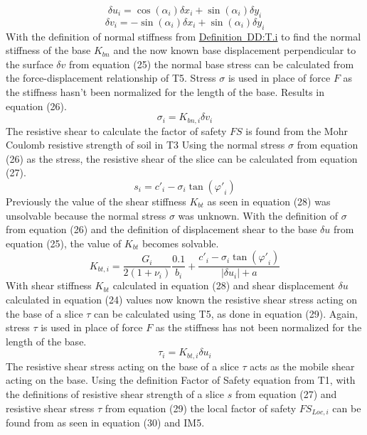 \documentclass[12pt]{article}
\begin{document}
\begin{dmath}
{δu}_{i}=\cos\left(α_{i}\right) {δx}_{i}+\sin\left(α_{i}\right) {δy}_{i}
\end{dmath}
\begin{dmath}
{δv}_{i}=-\sin\left(α_{i}\right) {δx}_{i}+\sin\left(α_{i}\right) {δy}_{i}
\end{dmath}
With the definition of normal stiffness from \hyperref[DD:T.i]{Definition~DD:T.i} to find the normal stiffness of the base ${K_{bn}}$ and the now known base displacement perpendicular to the surface $δv$ from equation (25) the normal base stress can be calculated from the force-displacement relationship of T5. Stress $σ$ is used in place of force $F$ as the stiffness hasn't been normalized for the length of the base. Results in equation (26).
\begin{dmath}
σ_{i}={K_{bn,i}} {δv}_{i}
\end{dmath}
The resistive shear to calculate the factor of safety $FS$ is found from the Mohr Coulomb resistive strength of soil in T3 Using the normal stress $σ$ from equation (26) as the stress, the resistive shear of the slice can be calculated from equation (27).
\begin{dmath}
s_{i}={c'}_{i}-σ_{i} \tan\left({φ'}_{i}\right)
\end{dmath}
Previously the value of the shear stiffness ${K_{bt}}$ as seen in equation (28) was unsolvable because the normal stress $σ$ was unknown. With the definition of $σ$ from equation (26) and the definition of displacement shear to the base $δu$ from equation (25), the value of ${K_{bt}}$ becomes solvable.
\begin{dmath}
{K_{bt,i}}=\frac{G_{i}}{2 \left(1+ν_{i}\right)} \frac{0.1}{b_{i}}+\frac{{c'}_{i}-σ_{i} \tan\left({φ'}_{i}\right)}{|{δu}_{i}|+a}
\end{dmath}
With shear stiffness ${K_{bt}}$ calculated in equation (28) and shear displacement $δu$ calculated in equation (24) values now known the resistive shear stress acting on the base of a slice $τ$ can be calculated using T5, as done in equation (29). Again, stress $τ$ is used in place of force $F$ as the stiffness has not been normalized for the length of the base.
\begin{dmath}
τ_{i}={K_{bt,i}} {δu}_{i}
\end{dmath}
The resistive shear stress acting on the base of a slice $τ$ acts as the mobile shear acting on the base. Using the definition Factor of Safety equation from T1, with the definitions of resistive shear strength of a slice $s$ from equation (27) and resistive shear stress $τ$ from equation (29) the local factor of safety ${FS_{Loc,i}}$ can be found from as seen in equation (30) and IM5.
\end{document}
